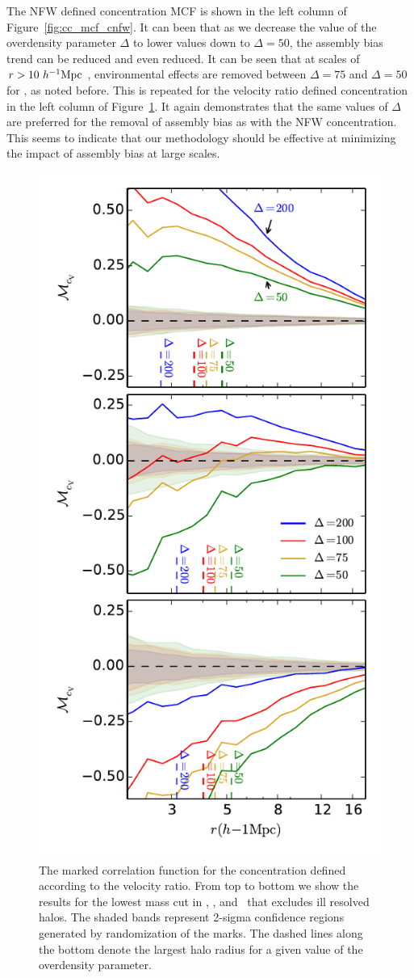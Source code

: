 \documentclass[usenatbib,usegraphicx,letterpaper]{mn2e}
\begin{document}
The NFW defined concentration MCF is shown in the left column of Figure~\ref{fig:cc_mcf_cnfw}. It can been that as we decrease the value of the overdensity parameter $\Delta$ to lower values down to $\Delta = 50$, the assembly bias trend can be reduced and even reduced. It can be seen that at scales of $r > 10 \ h^{-1}\mathrm{Mpc}~$, environmental effects are removed between $\Delta = 75$ and $\Delta = 50$ for \simB, as noted before. This is repeated for the velocity ratio defined concentration in the left column of Figure~\ref{fig:cc_mcf_cV}. It again demonstrates that the same values of $\Delta$ are preferred for the removal of assembly bias as with the NFW concentration. This seems to indicate that our methodology should be effective at minimizing the impact of assembly bias at large scales.

\begin{figure}
	\centering
	\includegraphics[width=.4\textwidth]{all_mcf_cV_z00_cutcomp.pdf}
	\caption{The marked correlation function for the concentration defined according to the velocity ratio. From top to bottom we show the results for the lowest mass cut in \simA, \simB, and \simC \ that excludes ill resolved halos. The shaded bands represent 2-sigma confidence regions generated by randomization of the marks. The dashed lines along the bottom denote the largest halo radius for a given value of the overdensity parameter.}
	\label{fig:cc_mcf_cV}
\end{figure}
\end{document}
